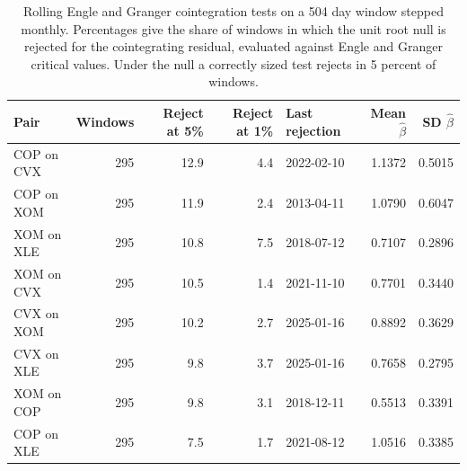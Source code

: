 \begin{table}[H]
\centering
\caption{Rolling Engle and Granger cointegration tests on a 504 day window stepped monthly. Percentages give the share of windows in which the unit root null is rejected for the cointegrating residual, evaluated against Engle and Granger critical values. Under the null a correctly sized test rejects in 5 percent of windows.} 
\label{tab:rolling_coint}
\begin{tabular}{lrrrlrr}
  \toprule
Pair & Windows & Reject at 5\% & Reject at 1\% & Last rejection & Mean $\hat{\beta}$ & SD $\hat{\beta}$ \\ 
  \midrule
COP on CVX & 295 & 12.9 & 4.4 & 2022-02-10 & 1.1372 & 0.5015 \\ 
  COP on XOM & 295 & 11.9 & 2.4 & 2013-04-11 & 1.0790 & 0.6047 \\ 
  XOM on XLE & 295 & 10.8 & 7.5 & 2018-07-12 & 0.7107 & 0.2896 \\ 
  XOM on CVX & 295 & 10.5 & 1.4 & 2021-11-10 & 0.7701 & 0.3440 \\ 
  CVX on XOM & 295 & 10.2 & 2.7 & 2025-01-16 & 0.8892 & 0.3629 \\ 
  CVX on XLE & 295 & 9.8 & 3.7 & 2025-01-16 & 0.7658 & 0.2795 \\ 
  XOM on COP & 295 & 9.8 & 3.1 & 2018-12-11 & 0.5513 & 0.3391 \\ 
  COP on XLE & 295 & 7.5 & 1.7 & 2021-08-12 & 1.0516 & 0.3385 \\ 
   \bottomrule
\end{tabular}
\end{table}
